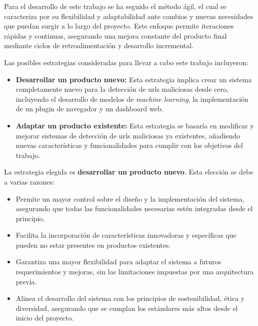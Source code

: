 Para el desarrollo de este trabajo se ha seguido el método ágil, el cual se caracteriza por su flexibilidad y adaptabilidad ante cambios y nuevas necesidades que puedan surgir a lo largo del proyecto. Este enfoque permite iteraciones rápidas y continuas, asegurando una mejora constante del producto final mediante ciclos de retroalimentación y desarrollo incremental.

Las posibles estrategias consideradas para llevar a cabo este trabajo incluyeron:

\begin{itemize}
    \item \textbf{Desarrollar un producto nuevo:} Esta estrategia implica crear un sistema completamente nuevo para la detección de \glspl{url} maliciosas desde cero, incluyendo el desarrollo de modelos de \textit{machine learning}, la implementación de un {\gls{plugin}} de navegador y un \gls{dashboard} web.
    \item \textbf{Adaptar un producto existente:} Esta estrategia se basaría en modificar y mejorar sistemas de detección de \glspl{url} maliciosas ya existentes, añadiendo nuevas características y funcionalidades para cumplir con los objetivos del trabajo.
\end{itemize}

La estrategia elegida es \textbf{desarrollar un producto nuevo}. Esta elección se debe a varias razones:

\begin{itemize}
    \item Permite un mayor control sobre el diseño y la implementación del sistema, asegurando que todas las funcionalidades necesarias estén integradas desde el principio.
    \item Facilita la incorporación de características innovadoras y específicas que pueden no estar presentes en productos existentes.
    \item Garantiza una mayor flexibilidad para adaptar el sistema a futuros requerimientos y mejoras, sin las limitaciones impuestas por una arquitectura previa.
    \item Alinea el desarrollo del sistema con los principios de sostenibilidad, ética y diversidad, asegurando que se cumplan los estándares más altos desde el inicio del proyecto.
\end{itemize}

